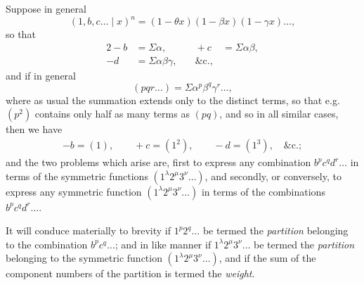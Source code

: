 \documentclass[11pt,a4paper]{article}
\begin{document}
Suppose in general
\[
(1, b, c \ldots \mid x)^n = (1 - \theta x)(1 - \beta x)(1 - \gamma x)\ldots,
\]
so that
\begin{alignat*}{2}
-b &= \Sigma\alpha, &\quad +c &= \Sigma\alpha\beta, \\
-d &= \Sigma\alpha\beta\gamma, &\quad \&\text{c.},
\end{alignat*}
and if in general
\[
(pqr\ldots) = \Sigma\alpha^p \beta^q \gamma^r \ldots,
\]
where as usual the summation extends only to the distinct terms, so that
e.g.\ $(p^2)$ contains only half as many terms as $(pq)$, and so in all
similar cases, then we have
\begin{gather*}
-b = (1), \qquad +c = (1^2), \qquad -d = (1^3), \quad \&\text{c.};
\end{gather*}
and the two problems which arise are, first to express any combination
$b^p c^q d^r \ldots$ in terms of the symmetric functions
$(1^{\lambda} 2^{\mu} 3^{\nu}\ldots)$, and secondly, or conversely, to express any
symmetric function $(1^{\lambda} 2^{\mu} 3^{\nu}\ldots)$ in terms of the
combinations $b^p c^q d^r \ldots$.

It will conduce materially to brevity if $1^p 2^q \ldots$ be termed the
\emph{partition} belonging to the combination $b^p c^q \ldots$; and in like
manner if $1^{\lambda} 2^{\mu} 3^{\nu}\ldots$ be termed the \emph{partition}
belonging to the symmetric function $(1^{\lambda} 2^{\mu} 3^{\nu}\ldots)$, and if
the sum of the component numbers of the partition is termed the \emph{weight}.
\end{document}
